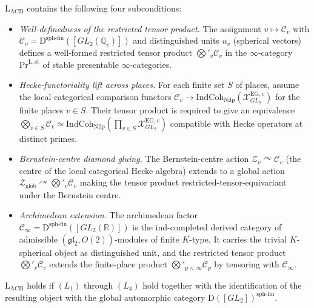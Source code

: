 \begin{theorem}
\label{v4-arith:acd:thm:modular-decomposition}
\(\mathrm{L}_{\mathrm{ACD}}\) contains the
following four subconditions:
\begin{itemize}
\item[\((L_{1})\)] \emph{Well-definedness of the restricted tensor
product.} The assignment \(v\mapsto\mathcal{C}_{v}\) with
\(\mathcal{C}_{v}=\mathrm{D}^{\mathrm{sph\text{-}fin}}([GL_{2}(\mathbb{Q}_{v})])\)
and distinguished units \(u_{v}\) (spherical vectors) defines a
well-formed restricted tensor product \(\bigotimes'_{v}\mathcal{C}_{v}\)
in the \(\infty\)-category \(\mathrm{Pr}^{\mathrm{L,st}}\) of stable
presentable \(\infty\)-categories.
\item[\((L_{2})\)] \emph{Hecke-functoriality lift across places.} For
each finite set \(S\) of places, assume the local categorical
comparison functors
\(\mathcal{C}_{v}\to\mathrm{IndCoh}_{\mathrm{Nilp}}(\mathcal{X}^{\mathrm{EG},v}_{GL_{2}})\)
for the finite places \(v\in S\).  Their tensor product is required to
give an equivalence
\(\bigotimes_{v\in S}\mathcal{C}_{v}\simeq\mathrm{IndCoh}_{\mathrm{Nilp}}(\prod_{v\in S}\mathcal{X}^{\mathrm{EG},v}_{GL_{2}})\)
compatible with Hecke operators at distinct primes.
\item[\((L_{3})\)] \emph{Bernstein-centre diamond gluing.} The
Bernstein-centre action
\(\mathcal{Z}_{v}\curvearrowright\mathcal{C}_{v}\) (the centre of the
local categorical Hecke algebra) extends to a global action
\(\mathcal{Z}_{\mathrm{glob}}\curvearrowright\bigotimes'_{v}\mathcal{C}_{v}\)
making the tensor product restricted-tensor-equivariant under the
Bernstein centre.
\item[\((L_{4})\)] \emph{Archimedean extension.} The archimedean
factor \(\mathcal{C}_{\infty}=\mathrm{D}^{\mathrm{sph\text{-}fin}}([GL_{2}(\mathbb{R})])\)
is the ind-completed derived category of admissible
\((\mathfrak{gl}_{2},O(2))\)-modules of finite \(K\)-type.  It carries
the trivial \(K\)-spherical object as distinguished unit, and the
restricted tensor product
\(\bigotimes'_{v}\mathcal{C}_{v}\) extends the finite-place product
\(\bigotimes'_{p<\infty}\mathcal{C}_{p}\) by tensoring with
\(\mathcal{C}_{\infty}\).
\end{itemize}
\(\mathrm{L}_{\mathrm{ACD}}\) holds if \((L_{1})\) through
\((L_{4})\) hold together with the identification of the resulting
object with the global automorphic category
\(\mathrm{D}([GL_{2}])^{\mathrm{sph\text{-}fin}}\).
\end{theorem}

